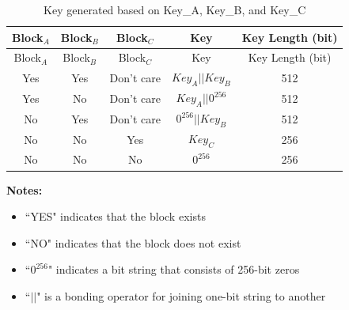 \begin{longtable}[c]{ |c|c|c|c|c| }
\caption{Key generated based on Key\_A, Key\_B, and Key\_C}
\label{tab:extmemencr-key-possibility}
\\\hline 
\rowcolor{lightgray}
Block$_A$ & Block$_B$ & Block$_C$ & Key  & Key Length (bit) \\\hline
\endfirsthead
\hline
\rowcolor{lightgray}
Block$_A$ & Block$_B$ & Block$_C$ & Key  & Key Length (bit) \\\hline
\endhead
\endfoot
Yes &   Yes   &  Don't care    &   \begin{math}\mathit{Key}_{A} || \mathit{Key}_{B}\end{math}    &   512   \\\hline
Yes &   No    &  Don't care    &   \begin{math}\mathit{Key}_{A} || 0^{256}\end{math}    &   512   \\\hline
No  &   Yes   &  Don't care    &   \begin{math}0^{256} || \mathit{Key}_{B}\end{math}    &   512   \\\hline
No  &   No    &  Yes       &   $\mathit{Key}_{C}$    &   256   \\\hline
No  &   No    &  No        &   $0^{256}$    &   256   \\\hline
\end{longtable}
\vspace{-1.5em}
{\bfseries Notes: }\\
\begin{itemize}
    \item ``YES" indicates that the block exists 
    \item ``NO" indicates that the block does not exist
    \item ``$0^{256}$" indicates a bit string that consists of 256-bit zeros
    \item ``\begin{math}||\end{math}" is a bonding operator for joining one-bit string to another
\end{itemize}

